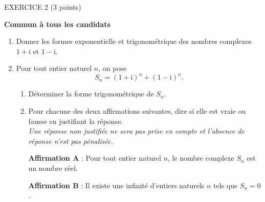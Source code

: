 
\begin{h2}EXERCICE 2 (3 points)\end{h2}
\textbf{Commun à tous les candidats}
\medskip
\begin{enumerate}
     \item Donner les formes exponentielle et trigonométrique des nombres complexes $1 + \text{i}$ et $1 - \text{i}$.
     \item  Pour tout entier naturel $n$, on pose
     \[S_n = (1 + \text{i})^n + (1 - \text{i})^n.\]
     \begin{enumerate}
          \item Déterminer la forme trigonométrique de $S_n$.
          \item Pour chacune des deux affirmations suivantes, dire si elle est vraie ou fausse en justifiant la réponse. \\
          \emph{Une réponse non justifiée ne sera pas prise en compte et l'absence de réponse n'est
          pas pénalisée.}
          \par
          \textbf{Affirmation A }: Pour tout entier naturel $n$, le nombre complexe $S_n$ est un nombre réel.
          \par
          \textbf{Affirmation B }: Il existe une infinité d'entiers naturels $n$ tels que $S_n = 0$.
     \end{enumerate}
\end{enumerate}
